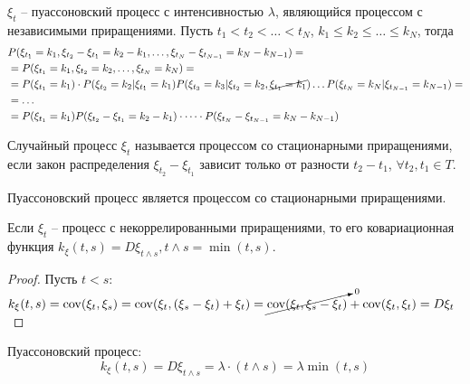 \begin{ex}
  $\xi_t$ -- пуассоновский процесс с интенсивностью $\lambda$, являющийся процессом с независимыми приращениями.
  Пусть $t_1 < t_2 < \dots < t_N$, $k_1 \leqslant k_2 \leqslant \dots \leqslant k_N$, тогда
  \begin{align*}
    &P(\xi_{t_1} = k_1, \xi_{t_2} - \xi_{t_1} = k_2 - k_1, \dots, \xi_{t_N} - \xi_{t_{N-1}} = k_N - k_{N-1}) =  \\
    &= P(\xi_{t_1} = k_1, \xi_{t_2} = k_2, \dots, \xi_{t_N} = k_N) = \\
    &= P(\xi_{t_1}=k_1) \cdot P(\xi_{t_2} = k_2 | \xi_{t_1} = k_1) P(\xi_{t_3}=k_3 | \xi_{t_2}=k_2, \cancel{\xi_{t_1} = k_1}) \dots P(\xi_{t_N}=k_N | \xi_{t_{N-1}} = k_{N-1}) = \\
    &= \dots \\ %
    &= P(\xi_{t_1} = k_1) P(\xi_{t_2}-\xi_{t_1} =k_2-k_1) \cdot \dots \cdot P(\xi_{t_N}-\xi_{t_{N-1}} = k_N - k_{N-1})
  \end{align*}
\end{ex}

\begin{definition}
  Случайный процесс $\xi_t$ называется процессом со стационарными приращениями,
  если закон распределения $\xi_{t_2} - \xi_{t_1}$ зависит только от разности $t_2-t_1$, $\forall t_2, t_1 \in T$.
\end{definition}

\begin{ex}
  Пуассоновский процесс является процессом со стационарными приращениями.
\end{ex}

\begin{theorem}
  Если $\xi_t$ -- процесс с некоррелированными приращениями, то его ковариационная функция
  $k_\xi(t, s) = D \xi_{t \wedge s}, t\wedge s = \min(t, s)$.
\end{theorem}
\begin{proof}
  Пусть $t<s$: $k_\xi(t, s) = \operatorname{cov} (\xi_t, \xi_s) = \operatorname{cov} (\xi_t, (\xi_s - \xi_t) + \xi_t)
  = \cancelto{0}{\operatorname{cov}(\xi_t, \xi_s - \xi_t)} + \operatorname{cov}(\xi_t, \xi_t) = D\xi_t$
\end{proof}

\begin{ex}
  Пуассоновский процесс:
  \[
    k_\xi(t, s) = D\xi_{t \wedge s} = \lambda \cdot (t \wedge s) = \lambda \min(t, s)
  \]
\end{ex}

